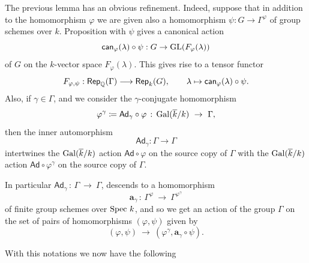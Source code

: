 \documentclass[twoside,leqno]{article}
\numberwithin{equation}{section}
\theoremstyle{plain}
\theoremstyle{definition}
\begin{document}
The previous lemma has an obvious refinement. Indeed, suppose that in
addition to the  homomorphism $\varphi$
we are given also a  homomorphism $\psi : G \to
\Gamma^{\varphi}$ of group schemes over $k$.
Proposition with $\psi$ gives a canonical action
\[
\mathsf{can}_{\varphi}(\lambda)\circ \psi : G \to \operatorname{GL}(F_{\varphi}(\lambda))
\]
of $G$ on the $k$-vector space $F_{\varphi}(\lambda)$.
This gives rise to a tensor functor
\[
F_{\varphi,\psi} : \mathsf{Rep}_{\mathbb Q}(\Gamma) \longrightarrow
\mathsf{Rep}_{k}(G), \qquad \lambda \mapsto
\mathsf{can}_{\varphi}(\lambda)\circ \psi. 
\]
Also, if $\gamma \in \Gamma$, and we consider the $\gamma$-conjugate homomorphism
\[
\varphi^{\gamma} \coloneqq \mathsf{Ad}_{\gamma}\circ \varphi \, : \, \Gal(\kbar/k) \ \to \ \Gamma,
\]
then the inner automorphism 
\[
\mathsf{Ad}_{\gamma} : \Gamma \to \Gamma
\]
intertwines the $\operatorname{Gal}(\overline{k}/k)$ action $\mathsf{Ad}\circ \varphi$ on the source copy of $\Gamma$ with the $\operatorname{Gal}(\overline{k}/k)$ action $\mathsf{Ad}\circ \varphi^{\gamma}$ on the source copy of $\Gamma$.

In particular $\mathsf{Ad}_{\gamma} \, : \, \Gamma \ \to \ \Gamma$, descends to a homomorphism
\[
\mathbf{a}_{\gamma} \, : \,  \Gamma^{\varphi} \ \to \ \Gamma^{\varphi^{\gamma}}
\]
of finite group schemes over $\operatorname{Spec}\, k$, and so we get an action of the group $\Gamma$ on the set of pairs of homomorphisms $(\varphi,\psi)$ given by 
\begin{equation} \label{eq:Gammaacts}
(\varphi,\psi) \ \to \ \left(\varphi^{\gamma},\mathbf{a}_{\gamma}\circ\psi\right).
\end{equation}


With this notations we now have the following
\end{document}
